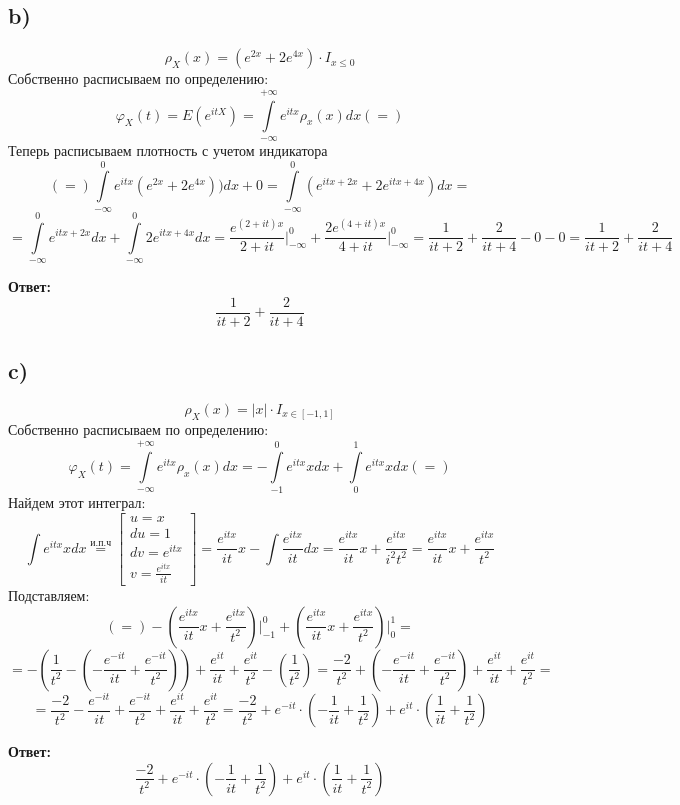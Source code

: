 \documentclass[a4paper,12pt]{article}
\begin{document}
\subsection*{b)}
\[
\rho_X(x) = (e^{2x} + 2e^{4x}) \cdot I_{x \leq 0}
\]
Собственно расписываем по определению:
\[
\varphi_X(t) = E \left( e^{itX} \right) =
\int\limits_{-\infty}^{+\infty} e^{itx} \rho_x(x) dx (=)
\]
Теперь расписываем плотность с учетом индикатора
\[
(=) 
\int\limits_{-\infty}^{0} e^{itx}(e^{2x} + 2e^{4x})) dx  + 0 = 
\int\limits_{-\infty}^0 
\left(
e^{itx + 2x} + 2e^{itx + 4x} \right) dx
=
\]
\[
=
\int\limits_{-\infty}^0 
e^{itx + 2x} dx
+
\int\limits_{-\infty}^0 
2e^{itx + 4x} dx
=
\frac{e^{(2 + it)x}}{2 + it} \Bigg|_{-\infty}^0 +\frac{2e^{(4 + it)x}}{4 + it} \Bigg|_{-\infty}^0 
=
\frac{1}{it + 2} + \frac{2}{it + 4} - 0 - 0 = \frac{1}{it + 2} + \frac{2}{it + 4}
\]
\begin{center}
\textbf{Ответ: } 
\[
 \frac{1}{it + 2} + \frac{2}{it + 4}
\]
\end{center}

\subsection*{c)}
\[
\rho_X(x) = |x|  \cdot I_{x \in [-1, 1]}
\]
Собственно расписываем по определению:
\[
\varphi_X(t) =\int\limits_{-\infty}^{+\infty} e^{itx} \rho_x(x) dx = -\int\limits_{-1}^0 e^{itx} x dx + \int\limits_0^1 e^{itx} x dx (=)
\]
Найдем этот интеграл:
\[
\int e^{itx} x dx \overset{\text{и.п.ч}}{=}
\begin{bmatrix}
u = x \\
du = 1 \\
dv = e^{itx} \\
v = \frac{e^{itx}}{it}
\end{bmatrix}
=
 \frac{e^{itx}}{it} x - \int\frac{e^{itx}}{it} dx =  \frac{e^{itx}}{it} x  + \frac{e^{itx}}{i^2t^2} =\frac{e^{itx}}{it} x  + \frac{e^{itx}}{t^2} 
\]
Подставляем:
\[
(=) -\left( \frac{e^{itx}}{it} x  + \frac{e^{itx}}{t^2} \right)  \Bigg|_{-1}^0 + \left( \frac{e^{itx}}{it} x  + \frac{e^{itx}}{t^2} \right)  \Bigg|_0^1  = 
\]
\[
=
- \left(
\frac{1}{t^2}
- \left(
-
\frac{e^{-it}}{it} + \frac{e^{-it}}{t^2}
\right)
\right)
+
\frac{e^{it}}{it} + \frac{e^{it}}{t^2} 
-
\left(
\frac{1}{t^2}
\right)
=
\frac{-2}{t^2} + \left(
-
\frac{e^{-it}}{it} + \frac{e^{-it}}{t^2}
\right)
+
\frac{e^{it}}{it} + \frac{e^{it}}{t^2} 
=
\]
\[
=
\frac{-2}{t^2} 
-
\frac{e^{-it}}{it} + \frac{e^{-it}}{t^2}
+
\frac{e^{it}}{it} + \frac{e^{it}}{t^2} 
=
\frac{-2}{t^2}  + e^{-it} \cdot
\left(
-\frac{1}{it} + \frac{1}{t^2}
\right)
+
e^{it} \cdot 
\left(
\frac{1}{it}
+
\frac{1}{t^2}
\right)
\]
\begin{center}
\textbf{Ответ: } 
\[
\frac{-2}{t^2}  + e^{-it} \cdot
\left(
-\frac{1}{it} + \frac{1}{t^2}
\right)
+
e^{it} \cdot 
\left(
\frac{1}{it}
+
\frac{1}{t^2}
\right)
\]
\end{center}
\end{document}
